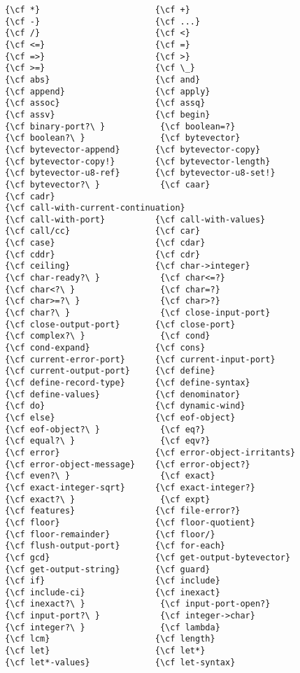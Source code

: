 \begin{verbatim}
{\cf *}                       {\cf +}
{\cf -}                       {\cf ...}
{\cf /}                       {\cf <}
{\cf <=}                      {\cf =}
{\cf =>}                      {\cf >}
{\cf >=}                      {\cf \_}
{\cf abs}                     {\cf and}
{\cf append}                  {\cf apply}
{\cf assoc}                   {\cf assq}
{\cf assv}                    {\cf begin}
{\cf binary-port?\ }           {\cf boolean=?}
{\cf boolean?\ }               {\cf bytevector}
{\cf bytevector-append}       {\cf bytevector-copy}
{\cf bytevector-copy!}        {\cf bytevector-length}
{\cf bytevector-u8-ref}       {\cf bytevector-u8-set!}
{\cf bytevector?\ }            {\cf caar}
{\cf cadr}
{\cf call-with-current-continuation}
{\cf call-with-port}          {\cf call-with-values}
{\cf call/cc}                 {\cf car}
{\cf case}                    {\cf cdar}
{\cf cddr}                    {\cf cdr}
{\cf ceiling}                 {\cf char->integer}
{\cf char-ready?\ }            {\cf char<=?}
{\cf char<?\ }                 {\cf char=?}
{\cf char>=?\ }                {\cf char>?}
{\cf char?\ }                  {\cf close-input-port}
{\cf close-output-port}       {\cf close-port}
{\cf complex?\ }               {\cf cond}
{\cf cond-expand}             {\cf cons}
{\cf current-error-port}      {\cf current-input-port}
{\cf current-output-port}     {\cf define}
{\cf define-record-type}      {\cf define-syntax}
{\cf define-values}           {\cf denominator}
{\cf do}                      {\cf dynamic-wind}
{\cf else}                    {\cf eof-object}
{\cf eof-object?\ }            {\cf eq?}
{\cf equal?\ }                 {\cf eqv?}
{\cf error}                   {\cf error-object-irritants}
{\cf error-object-message}    {\cf error-object?}
{\cf even?\ }                  {\cf exact}
{\cf exact-integer-sqrt}      {\cf exact-integer?}
{\cf exact?\ }                 {\cf expt}
{\cf features}                {\cf file-error?}
{\cf floor}                   {\cf floor-quotient}
{\cf floor-remainder}         {\cf floor/}
{\cf flush-output-port}       {\cf for-each}
{\cf gcd}                     {\cf get-output-bytevector}
{\cf get-output-string}       {\cf guard}
{\cf if}                      {\cf include}
{\cf include-ci}              {\cf inexact}
{\cf inexact?\ }               {\cf input-port-open?}
{\cf input-port?\ }            {\cf integer->char}
{\cf integer?\ }               {\cf lambda}
{\cf lcm}                     {\cf length}
{\cf let}                     {\cf let*}
{\cf let*-values}             {\cf let-syntax}

\end{verbatim}
